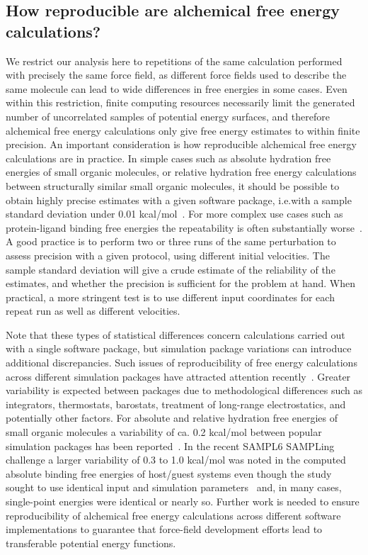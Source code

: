 \documentclass[9pt,bestpractices]{livecoms}
\begin{document}
\subsection{How reproducible are alchemical free energy calculations?}
\label{subsec:reproducible}
We restrict our analysis here to repetitions of the same calculation performed with precisely the same force field, as different force fields used to describe the same molecule can lead to wide differences in free energies in some cases.  Even within this restriction,
finite computing resources necessarily limit the generated number of uncorrelated samples of potential energy surfaces, and therefore alchemical free energy calculations only give free energy estimates to within finite precision. An important consideration is how reproducible alchemical free energy calculations are in practice. In simple cases such as absolute hydration free energies of small organic molecules, or relative hydration free energy calculations between structurally similar small organic molecules, it should be possible to obtain highly precise estimates with a given software package, i.e.with a sample standard deviation under 0.01 kcal/mol~\cite{rizzi2019sampl6}.
For more complex use cases such as protein-ligand binding free energies the repeatability is often substantially worse~\cite{rizzi2019sampl6}. A good practice is to perform two or three runs of the same perturbation to assess precision with a given protocol, using different initial velocities. The sample standard deviation will give a crude estimate of the reliability of the estimates, and whether the precision is sufficient for the problem at hand. When practical, a more stringent test is to use different input coordinates for each repeat run as well as different velocities. 

Note that these types of statistical differences concern calculations carried out with a single software package, but simulation package variations can introduce additional discrepancies. Such issues of reproducibility of free energy calculations across different simulation packages have attracted attention recently~\cite{loeffler2018reproducibility,rizzi2019sampl6}. Greater variability is expected between packages due to methodological differences such as integrators, thermostats, barostats, treatment of long-range electrostatics, and potentially other factors. For absolute and relative hydration free energies of small organic molecules a variability of ca. 0.2 kcal/mol between popular simulation packages has been reported~\cite{loeffler2018reproducibility}. In the recent SAMPL6 SAMPLing challenge a larger variability of 0.3 to 1.0 kcal/mol was noted in the computed absolute binding free energies of host/guest systems even though the study sought to use identical input and simulation parameters~\cite{rizzi2019sampl6} and, in many cases, single-point energies were identical or nearly so. Further work is needed to ensure reproducibility of alchemical free energy calculations across different software implementations to guarantee that force-field development efforts lead to transferable potential energy functions. 
\end{document}
